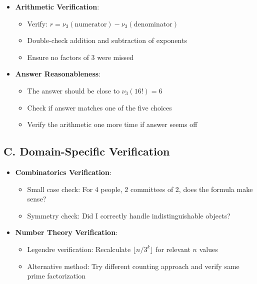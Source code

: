 \documentclass[12pt]{article}
\begin{document}
\begin{verificationbox}
\begin{itemize}[leftmargin=*]
    \item \textbf{Arithmetic Verification}:
    \begin{itemize}
        \item Verify: $r = \nu_3(\text{numerator}) - \nu_3(\text{denominator})$
        \item Double-check addition and subtraction of exponents
        \item Ensure no factors of 3 were missed
    \end{itemize}
    
    \item \textbf{Answer Reasonableness}:
    \begin{itemize}
        \item The answer should be close to $\nu_3(16!) = 6$
        \item Check if answer matches one of the five choices
        \item Verify the arithmetic one more time if answer seems off
    \end{itemize}
\end{itemize}

\subsection*{C. Domain-Specific Verification}
\begin{itemize}[leftmargin=*]
    \item \textbf{Combinatorics Verification}:
    \begin{itemize}
        \item Small case check: For 4 people, 2 committees of 2, does the formula make sense?
        \item Symmetry check: Did I correctly handle indistinguishable objects?
    \end{itemize}
    
    \item \textbf{Number Theory Verification}:
    \begin{itemize}
        \item Legendre verification: Recalculate $\lfloor n/3^k \rfloor$ for relevant $n$ values
        \item Alternative method: Try different counting approach and verify same prime factorization
    \end{itemize}
\end{itemize}
\end{verificationbox}
\end{document}
